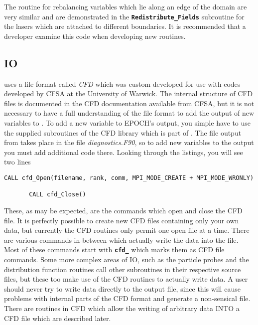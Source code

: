 \documentclass[12pt,a4paper]{article}
\newcommand{\simpleboxverbatim}{\begin{Verbatim}[obeytabs=true,frame=single,
  framerule=0.5mm,rulecolor=\color{warwickmid},formatcom=\color{black}]}
\newcommand{\inlinecode}[1]{{\color{warwickred} \bf\texttt{#1}}}
\newcommand{\EPOCH}{{\color{warwickdark}\fontfamily{phv}\selectfont{EPOCH}}}
\begin{document}
The routine for rebalancing variables which lie along an edge of the domain are
very similar and are demonstrated in the \inlinecode{Redistribute\_Fields}
subroutine for the lasers which are attached to different boundaries. It is
recommended that a developer examine this code when developing new routines.

\subsection{{\EPOCH} IO}

{\EPOCH} uses a file format called {\it CFD} which was custom developed for use
with codes developed by CFSA at the University of Warwick. The internal
structure of CFD files is documented in the CFD documentation available from
CFSA, but it is not necessary to have a full understanding of the file format
to add the output of new variables to \EPOCH. To add a new variable to EPOCH's
output, you simple have to use the supplied subroutines of the CFD library
which is part of \EPOCH. The file output from {\EPOCH} takes place in the file
{\it diagnostics.F90}, so to add new variables to the output you must add
additional code there. Looking through the listings, you will see two lines

\simpleboxverbatim
       CALL cfd_Open(filename, rank, comm, MPI_MODE_CREATE + MPI_MODE_WRONLY)

       CALL cfd_Close()
\end{Verbatim}

These, as may be expected, are the commands which open and close the CFD
file. It is perfectly possible to create new CFD files containing only your own
data, but currently the CFD routines only permit one open file at a time. There
are various commands in-between which actually write the data into the
file. Most of these commands start with \inlinecode{cfd\_} which marks them as
CFD file commands. Some more complex areas of IO, such as the particle probes
and the distribution function routines call other subroutines in their
respective source files, but these too make use of the CFD routines to actually
write data. A user should never try to write data directly to the output file,
since this will cause problems with internal parts of the CFD format and
generate a non-sensical file. There are routines in CFD which allow the writing
of arbitrary data INTO a CFD file which are described later.
\end{document}
